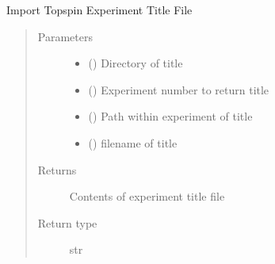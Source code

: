 \documentclass[letterpaper,10pt,english]{sphinxmanual}
\begin{document}
\begin{fulllineitems}
\label{\detokenize{dnpImport:dnpLab.dnpImport.topspin.load_title}}
Import Topspin Experiment Title File
\begin{quote}\begin{description}
\item[{Parameters}] \leavevmode\begin{itemize}
\item {} 
 () \sphinxhyphen{}\sphinxhyphen{} Directory of title

\item {} 
 () \sphinxhyphen{}\sphinxhyphen{} Experiment number to return title

\item {} 
 () \sphinxhyphen{}\sphinxhyphen{} Path within experiment of title

\item {} 
 () \sphinxhyphen{}\sphinxhyphen{} filename of title

\end{itemize}

\item[{Returns}] \leavevmode
Contents of experiment title file

\item[{Return type}] \leavevmode
str

\end{description}\end{quote}

\end{fulllineitems}

\end{document}
